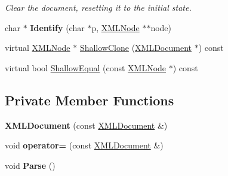 \begin{DoxyCompactItemize}
\begin{DoxyCompactList}\small\item\em Clear the document, resetting it to the initial state. \end{DoxyCompactList}\item 
char $\ast$ {\bfseries Identify} (char $\ast$p, \hyperlink{classtinyxml2_1_1_x_m_l_node}{X\+M\+L\+Node} $\ast$$\ast$node)\hypertarget{classtinyxml2_1_1_x_m_l_document_af255cf899d2bf5dbae54c9b6de9c2752}{}\label{classtinyxml2_1_1_x_m_l_document_af255cf899d2bf5dbae54c9b6de9c2752}

\item 
virtual \hyperlink{classtinyxml2_1_1_x_m_l_node}{X\+M\+L\+Node} $\ast$ \hyperlink{classtinyxml2_1_1_x_m_l_document_a57c8511ed9f83aa3e20909a3db3f83d0}{Shallow\+Clone} (\hyperlink{classtinyxml2_1_1_x_m_l_document}{X\+M\+L\+Document} $\ast$) const 
\item 
virtual bool \hyperlink{classtinyxml2_1_1_x_m_l_document_a12eac66c6e45d074d5cc47319868cd66}{Shallow\+Equal} (const \hyperlink{classtinyxml2_1_1_x_m_l_node}{X\+M\+L\+Node} $\ast$) const 
\end{DoxyCompactItemize}
\subsection*{Private Member Functions}
\begin{DoxyCompactItemize}
\item 
{\bfseries X\+M\+L\+Document} (const \hyperlink{classtinyxml2_1_1_x_m_l_document}{X\+M\+L\+Document} \&)\hypertarget{classtinyxml2_1_1_x_m_l_document_adcea490db02a099d99440cd14a87d9e4}{}\label{classtinyxml2_1_1_x_m_l_document_adcea490db02a099d99440cd14a87d9e4}

\item 
void {\bfseries operator=} (const \hyperlink{classtinyxml2_1_1_x_m_l_document}{X\+M\+L\+Document} \&)\hypertarget{classtinyxml2_1_1_x_m_l_document_aa542c2cf1276ee4bd778f16d196fe222}{}\label{classtinyxml2_1_1_x_m_l_document_aa542c2cf1276ee4bd778f16d196fe222}

\item 
void {\bfseries Parse} ()\hypertarget{classtinyxml2_1_1_x_m_l_document_aeb556e0e2bed02a73a6c5aaf19759e9a}{}\label{classtinyxml2_1_1_x_m_l_document_aeb556e0e2bed02a73a6c5aaf19759e9a}

\end{DoxyCompactItemize}
